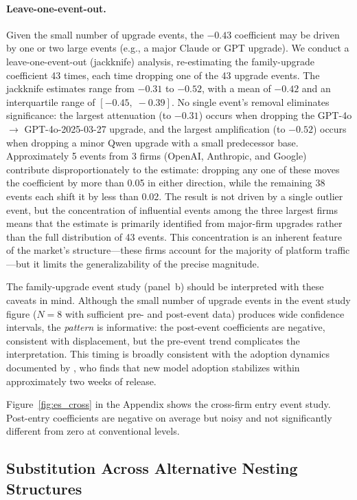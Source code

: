 \documentclass[11pt, a4paper]{article}
\begin{document}
\paragraph{Leave-one-event-out.} Given the small number of upgrade events, the $-0.43$ coefficient may be driven by one or two large events (e.g., a major Claude or GPT upgrade). We conduct a leave-one-event-out (jackknife) analysis, re-estimating the family-upgrade coefficient 43 times, each time dropping one of the 43 upgrade events. The jackknife estimates range from $-0.31$ to $-0.52$, with a mean of $-0.42$ and an interquartile range of $[-0.45,\; -0.39]$. No single event's removal eliminates significance: the largest attenuation (to $-0.31$) occurs when dropping the GPT-4o $\to$ GPT-4o-2025-03-27 upgrade, and the largest amplification (to $-0.52$) occurs when dropping a minor Qwen upgrade with a small predecessor base. Approximately 5 events from 3 firms (OpenAI, Anthropic, and Google) contribute disproportionately to the estimate: dropping any one of these moves the coefficient by more than 0.05 in either direction, while the remaining 38 events each shift it by less than 0.02. The result is not driven by a single outlier event, but the concentration of influential events among the three largest firms means that the estimate is primarily identified from major-firm upgrades rather than the full distribution of 43 events. This concentration is an inherent feature of the market's structure---these firms account for the majority of platform traffic---but it limits the generalizability of the precise magnitude.

The family-upgrade event study (panel~b) should be interpreted with these caveats in mind. Although the small number of upgrade events in the event study figure ($N = 8$ with sufficient pre- and post-event data) produces wide confidence intervals, the \emph{pattern} is informative: the post-event coefficients are negative, consistent with displacement, but the pre-event trend complicates the interpretation. This timing is broadly consistent with the adoption dynamics documented by \citet{fradkin2025demand}, who finds that new model adoption stabilizes within approximately two weeks of release.

Figure~\ref{fig:es_cross} in the Appendix shows the cross-firm entry event study. Post-entry coefficients are negative on average but noisy and not significantly different from zero at conventional levels.

\subsection{Substitution Across Alternative Nesting Structures}
\end{document}
